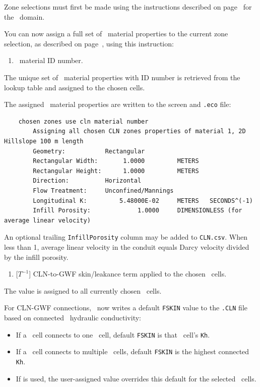 Zone selections must first be made using the instructions described on page~\pageref{page:zoneSelect} for the \gwf\ domain.

You can now assign a full set of \cln\ material properties to the current zone selection, as described on page~\pageref{page:zoneSelect}, using this instruction:

    {
        \squish
        \begin{enumerate}
        \item {}  \cln\ material ID number.
        \end{enumerate}
        The unique set of \cln\ material properties with ID number  is retrieved from the lookup table and assigned to the chosen cells.    }

The assigned \cln\ material properties are written to the screen and \texttt{.eco} file:
\begin{verbatim}
    chosen zones use cln material number
    	Assigning all chosen CLN zones properties of material 1, 2D Hillslope 100 m length
    	Geometry:           Rectangular
    	Rectangular Width:       1.0000         METERS
    	Rectangular Height:      1.0000         METERS
    	Direction:          Horizontal
    	Flow Treatment:     Unconfined/Mannings
    	Longitudinal K:         5.48000E-02     METERS   SECONDS^(-1)
    	Infill Porosity:             1.0000     DIMENSIONLESS (for average linear velocity)
\end{verbatim}

An optional trailing \texttt{InfillPorosity} column may be added to \texttt{CLN.csv}. When less than 1, average linear velocity in the conduit equals Darcy velocity divided by the infill porosity.

    {
        \squish
        \begin{enumerate}
        \item {} [$T^{-1}$]  CLN-to-GWF skin/leakance term applied to the chosen \cln\ cells.
        \end{enumerate}
        The value  is assigned to all currently chosen \cln\ cells.
    }

For CLN-GWF connections, \mut\ now writes a default \texttt{FSKIN} value to the \texttt{.CLN} file based on connected \gwf\ hydraulic conductivity:
\begin{itemize}
\item If a \cln\ cell connects to one \gwf\ cell, default \texttt{FSKIN} is that \gwf\ cell's \texttt{Kh}.
\item If a \cln\ cell connects to multiple \gwf\ cells, default \texttt{FSKIN} is the highest connected \texttt{Kh}.
\item If  is used, the user-assigned value overrides this default for the selected \cln\ cells.
\end{itemize}

